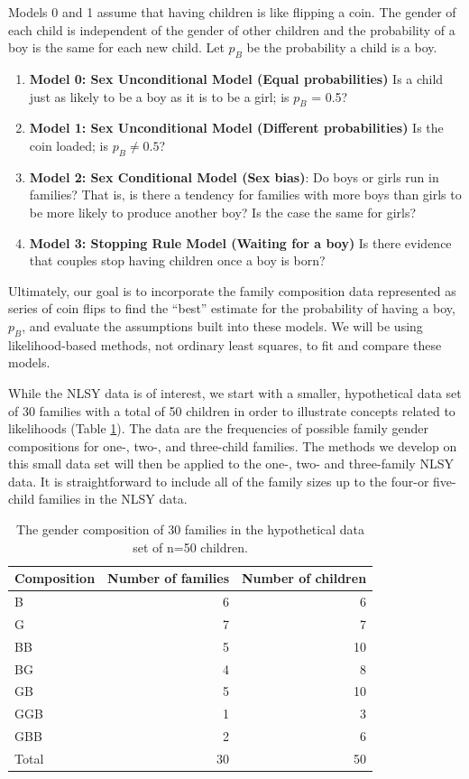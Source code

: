 \documentclass[
]{krantz}
\providecommand{\tightlist}{%
  \setlength{\itemsep}{0pt}\setlength{\parskip}{0pt}}
\begin{document}
Models 0 and 1 assume that having children is like flipping a coin. The gender of each child is independent of the gender of other children and the probability of a boy is the same for each new child. Let \(p_B\) be the probability a child is a boy.

\begin{enumerate}
\def\labelenumi{\arabic{enumi}.}
\tightlist
\item
  \textbf{Model 0: Sex Unconditional Model (Equal probabilities)} Is a child just as likely to be a boy as it is to be a girl; is \(p_B\) = 0.5?
\item
  \textbf{Model 1: Sex Unconditional Model (Different probabilities)} Is the coin loaded; is \(p_B \neq 0.5\)?
\item
  \textbf{Model 2: Sex Conditional Model (Sex bias)}: Do boys or girls run in families? That is,
  is there a tendency for families with more boys than girls to be more likely to produce another boy? Is the case the same for girls?
\item
  \textbf{Model 3: Stopping Rule Model (Waiting for a boy)}
  Is there evidence that couples stop having children once a boy is born?
\end{enumerate}

Ultimately, our goal is to incorporate the family composition data represented as series of coin flips to find the ``best'' estimate for the probability of having a boy, \(p_B\), and evaluate the assumptions built into these models. We will be using likelihood-based methods, not ordinary least squares, to fit and compare these models.

While the NLSY data is of interest, we start with a smaller, hypothetical data set of 30 families with a total of 50 children in order to illustrate concepts related to likelihoods (Table \ref{tab:table1chp2}). The data are the frequencies of possible family gender compositions for one-, two-, and three-child families. The methods we develop on this small data set will then be applied to the one-, two- and three-family NLSY data. It is straightforward to include all of the family sizes up to the four-or five-child families in the NLSY data.

\begin{table}

\caption{\label{tab:table1chp2}The gender composition of 30 families in the hypothetical data set of n=50 children.}
\centering
\begin{tabular}[t]{lrr}
\toprule
Composition & Number of families & Number of children\\
\midrule
B & 6 & 6\\
G & 7 & 7\\
BB & 5 & 10\\
BG & 4 & 8\\
GB & 5 & 10\\
\addlinespace
GGB & 1 & 3\\
GBB & 2 & 6\\
Total & 30 & 50\\
\bottomrule
\end{tabular}
\end{table}
\end{document}
